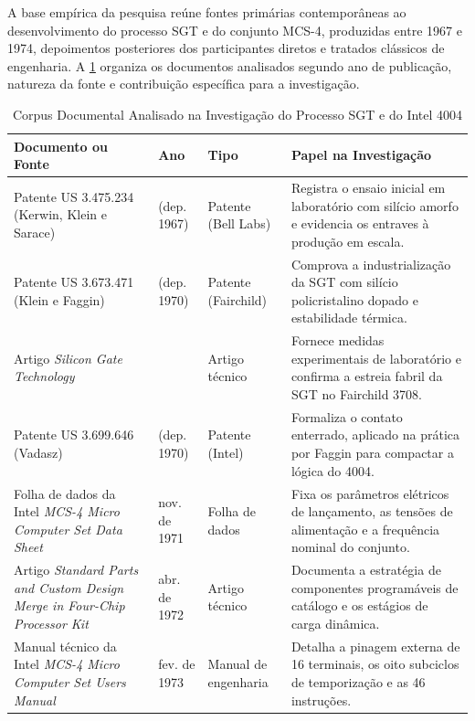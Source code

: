A base empírica da pesquisa reúne fontes primárias contemporâneas ao desenvolvimento do processo SGT e do conjunto MCS-4, produzidas entre 1967 e 1974, depoimentos posteriores dos participantes diretos e tratados clássicos de engenharia. A \cref{tab:corpus_documental} organiza os documentos analisados segundo ano de publicação, natureza da fonte e contribuição específica para a investigação.

\begin{table}[!t]
\renewcommand{\arraystretch}{1.2}
\caption{Corpus Documental Analisado na Investigação do Processo SGT e do Intel 4004}
\label{tab:corpus_documental}
\centering
\begin{tabularx}{\textwidth}{>{\raggedright\arraybackslash}p{5.1cm} >{\centering\arraybackslash}p{2.3cm} >{\raggedright\arraybackslash}p{2.9cm} >{\raggedright\arraybackslash}X}
\toprule
\textbf{Documento ou Fonte} & \textbf{Ano} & \textbf{Tipo} & \textbf{Papel na Investigação} \\
\midrule
Patente US 3.475.234 (Kerwin, Klein e Sarace) \cite{kerwin1969patent} & 1969 (dep. 1967) & Patente (Bell Labs) & Registra o ensaio inicial em laboratório com silício amorfo e evidencia os entraves à produção em escala. \\
Patente US 3.673.471 (Klein e Faggin) \cite{klein1972patent} & 1972 (dep. 1970) & Patente (Fairchild) & Comprova a industrialização da SGT com silício policristalino dopado e estabilidade térmica. \\
Artigo \textit{Silicon Gate Technology} \cite{faggin1970} & 1970 & Artigo técnico & Fornece medidas experimentais de laboratório e confirma a estreia fabril da SGT no Fairchild 3708. \\
Patente US 3.699.646 (Vadasz) \cite{vadasz1972patent} & 1972 (dep. 1970) & Patente (Intel) & Formaliza o contato enterrado, aplicado na prática por Faggin para compactar a lógica do 4004. \\
Folha de dados da Intel \textit{MCS-4 Micro Computer Set Data Sheet} \cite{intel1971datasheet} & nov. de 1971 & Folha de dados & Fixa os parâmetros elétricos de lançamento, as tensões de alimentação e a frequência nominal do conjunto. \\
Artigo \textit{Standard Parts and Custom Design Merge in Four-Chip Processor Kit} \cite{faggin1972fourchip} & abr. de 1972 & Artigo técnico & Documenta a estratégia de componentes programáveis de catálogo e os estágios de carga dinâmica. \\
Manual técnico da Intel \textit{MCS-4 Micro Computer Set Users Manual} \cite{intel1973mcs4} & fev. de 1973 & Manual de engenharia & Detalha a pinagem externa de 16 terminais, os oito subciclos de temporização e as 46 instruções. \\

\end{tabularx}
\end{table}
